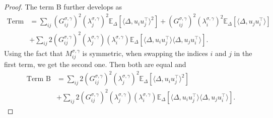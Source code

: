 \documentclass[11pt]{article}
\newcommand{\eqdef}{\coloneqq}
\newcommand{\EE}{\mathbb{E}}
\begin{document}
\begin{proof}
The term B further develops as
\begin{align*}
\text{Term B} &= \sum_{ij}   \left( G^{\sigma, \gamma}_{ij} \right)^2 (\lambda^{\sigma, \gamma}_j)^2 \EE_{\Delta}\left[\langle \Delta, u_i u_j^\top \rangle^2\right]  + \left( G^{\sigma, \gamma}_{ij} \right)^2 \left(\lambda^{\sigma, \gamma}_i\right)^2 \EE_{\Delta}\left[\langle \Delta, u_j u_i^\top \rangle\right] \\
&\nonumber +   \sum_{ij}  2\left( G^{\sigma, \gamma}_{ij} \right)^2 (\lambda^{\sigma, \gamma}_j) \left(\lambda^{\sigma, \gamma}_i\right) \EE_{\Delta}\left[\langle \Delta, u_i u_j^\top \rangle \langle \Delta, u_j u_i^\top \rangle \right] .
\end{align*}
Using the fact that $M_{ij}^{\sigma, \gamma}$ is symmetric, when swapping the indices $i$ and $j$ in the first term, we get the second one. Then both are equal and
\begin{align*}
\text{Term B} &= \sum_{ij}  2 \left( G^{\sigma, \gamma}_{ij} \right)^2 (\lambda^{\sigma, \gamma}_j)^2 \EE_{\Delta}\left[\langle \Delta, u_i u_j^\top \rangle^2\right] \\ &+ \nonumber  \sum_{ij} 2 \left( G^{\sigma, \gamma}_{ij} \right)^2 (\lambda^{\sigma, \gamma}_j) \left(\lambda^{\sigma, \gamma}_i\right) \EE_{\Delta}\left[\langle \Delta, u_i u_j^\top \rangle \langle \Delta, u_j u_i^\top \rangle \right]  .
\end{align*}


\end{proof}
\end{document}

